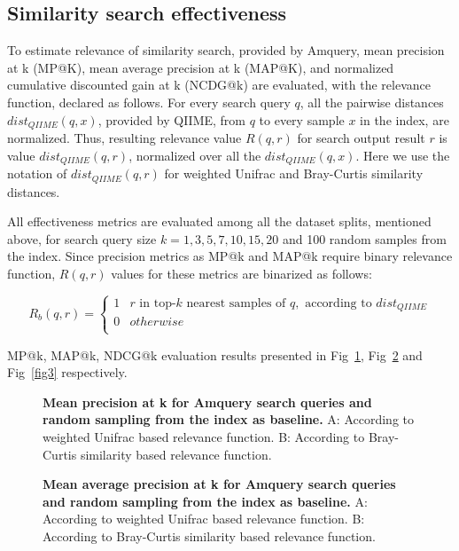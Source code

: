 \documentclass[10pt,letterpaper]{article}
\begin{document}
\subsection*{Similarity search effectiveness}
To estimate relevance of similarity search, provided by Amquery, mean precision at k (MP@K), mean average precision at k (MAP@K), and normalized cumulative discounted gain at k (NCDG@k) \cite{book, jarvelin2000ir, jarvelin2002cumulated}
are evaluated, with the relevance function, declared as follows. For every search query $q$, all the pairwise distances $dist_{QIIME}(q, x)$, provided by QIIME, from $q$ to every sample $x$ in the index, are normalized. 
Thus, resulting relevance value $R(q, r)$ for search output result $r$ is value $dist_{QIIME}(q, r)$, normalized over all the $dist_{QIIME}(q, x)$. Here we use the notation of $dist_{QIIME}(q, r)$ for weighted Unifrac and Bray-Curtis similarity distances.

All effectiveness metrics are evaluated among all the dataset splits, mentioned above, for search query size $k = {1, 3, 5, 7, 10, 15, 20}$ and 100 random samples from the index. Since precision metrics as MP@k and MAP@k require binary relevance function,
$R(q, r)$ values for these metrics are binarized as follows:

\[ R_b(q, r)  =
  \begin{cases}
    1  & r \text{ in top-} k \text{ nearest samples of } q, \text{ according to } dist_{QIIME}\\
    0  &  otherwise \\
  \end{cases}
\] 

MP@k, MAP@k, NDCG@k evaluation results presented in Fig~\ref{fig1}, Fig~\ref{fig2} and Fig~\ref{fig3} respectively.

\begin{figure}[!h]
\caption{{\bf Mean precision at k for Amquery search queries and random sampling from the index as baseline.}
A: According to weighted Unifrac based relevance function. B: According to Bray-Curtis similarity based relevance function.}
\label{fig1}
\end{figure}

\begin{figure}[!h]
\caption{{\bf Mean average precision at k for Amquery search queries and random sampling from the index as baseline.}
A: According to weighted Unifrac based relevance function. B: According to Bray-Curtis similarity based relevance function.}
\label{fig2}
\end{figure}
\end{document}
